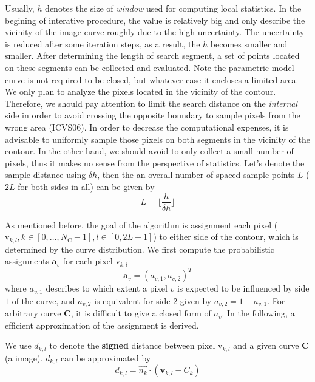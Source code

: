 Usually, $h$ denotes the size of \textit{window} used for computing
local statistics. In the begining of interative procedure, the value
is relatively big and only describe the vicinity of the image curve
roughly due to the high uncertainty. The
uncertainty is reduced after some iteration steps, as a result, the $h$ becomes smaller and
smaller. After determining the length of search segment, 
a set of points located on these segments can be collected and
evaluated. Note the parametric model curve is not required to be
closed, but whatever case it encloses a limited area. We only plan to
analyze the pixels located in the vicinity of the contour. Therefore,
we should pay attention to limit the search distance on the
\textit{internal} side in order to avoid crossing the opposite
boundary to sample pixels from the wrong area (ICVS06). In order to
decrease the computational expenses, it is advisable to uniformly sample those
pixels on both segments in the vicinity of the contour. In the other
hand, we should avoid to only collect a small number of pixels, thus
it makes no sense from the perspective of statistics. Let's denote the
sample distance using $\delta h$, then the an overall number of spaced
sample points $L$ ($2L$ for both sides in all) can be given by 
\begin{equation}
  \label{eq:5.5}
  L = \lfloor \frac{h}{\delta h} \rfloor
\end{equation}

As mentioned before, the goal of the algorithm is assignment each pixel
($\mathrm{v}_{k,l}, k \in [0,\ldots,N_{\mathrm{C}}-1], l \in [0,
2L-1]$) to either side of the contour, which is determined by the
curve distribution. We first compute the probabilistic
assignments $\mathbf{a}_{v}$ for each pixel $\mathrm{v}_{k,l}$
\begin{equation}
  \label{eq:5.6}
  \mathbf{a}_v  = (a_{v,1}, a_{v,2})^T
\end{equation}
where $a_{v,1}$ describes to which extent a pixel $v$ is expected to
be influenced by side $1$ of the curve, and $a_{v,2}$ is equivalent
for side 2 given by $a_{v,2} = 1- a_{v,1}$. For arbitrary curve
$\mathbf{C}$, it is difficult to give a closed form of $a_v$. In the
following, a efficient approximation of the assignment is derived.

We use $d_{k,l}$ to denote the \textbf{signed} distance between pixel
$\mathrm{v}_{k,l}$ and a given curve $\mathbf{C}$(a image). $d_{k,l}$
can be approximated by
\begin{equation}
  \label{eq:5.7}
  d_{k,l} = \vec{n_k} \cdot ( \mathbf{v}_{k,l} - C_k)
\end{equation}

